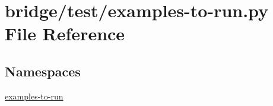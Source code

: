 \hypertarget{bridge_2test_2examples-to-run_8py}{}\section{bridge/test/examples-\/to-\/run.py File Reference}
\label{bridge_2test_2examples-to-run_8py}
\subsection*{Namespaces}
\begin{DoxyCompactItemize}
\item 
 \hyperlink{namespaceexamples-to-run}{examples-\/to-\/run}
\end{DoxyCompactItemize}
